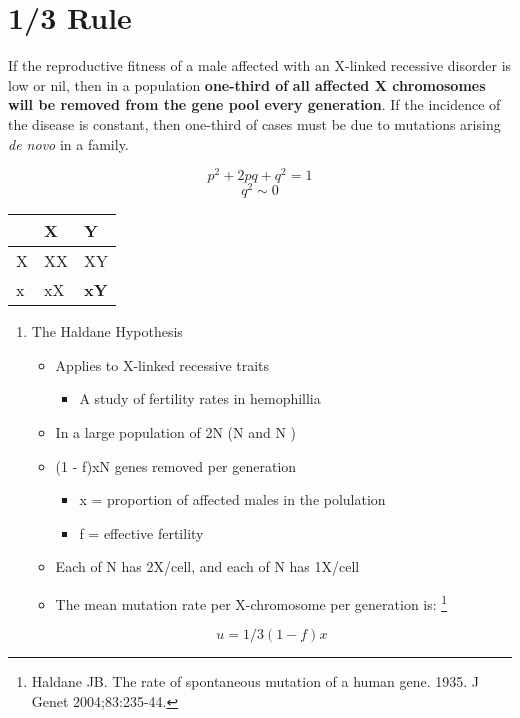 \documentclass{scrartcl}
\begin{document}
\section{1/3 Rule}
\label{sec:org8863a86}
If the reproductive fitness of a male affected with an X-linked
recessive disorder is low or nil, then in a population \textbf{one-third of}
\textbf{all affected X chromosomes will be removed from the gene pool every
generation}. If the incidence of the disease is constant, then
one-third of cases must be due to mutations arising \emph{de novo} in a
family.


\[
 p^2 + 2pq + q^2 = 1 
 \]
\[
 q^2 \sim 0
 \]

\begin{center}
\begin{tabular}{lll}
 & X & Y\\
\hline
X & XX & XY\\
\hline
x & xX & \textbf{xY}\\
\end{tabular}
\end{center}


\begin{enumerate}
\item The Haldane Hypothesis
\label{sec:orge8895aa}
\begin{itemize}
\item Applies to X-linked recessive traits
\begin{itemize}
\item A study of fertility rates in hemophillia
\end{itemize}

\item In a large population of 2N (N \male{} and N \female)
\item (1 - f)xN genes removed per generation
\begin{itemize}
\item x = proportion of affected males in the polulation
\item f = effective fertility
\end{itemize}

\item Each of N \female{} has 2X/cell, and each of N \male{} has 1X/cell
\item The mean mutation rate per X-chromosome per generation is: \footnote{Haldane JB. The rate of spontaneous mutation of a human gene. 1935. J Genet 2004;83:235-44.}
\end{itemize}

\[
 u = 1/3(1 - f)x  
 \]
\end{enumerate}
\end{document}
